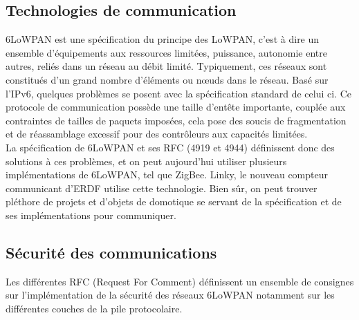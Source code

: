 	\subsection{Technologies de communication}
		6LoWPAN est une spécification du principe des LoWPAN, c'est à dire un ensemble d'équipements aux ressources limitées, puissance, autonomie entre autres, reliés dans un réseau au débit limité. Typiquement, ces réseaux sont constitués d'un grand nombre d'éléments ou nœuds dans le réseau.
		Basé sur l'IPv6, quelques problèmes se posent avec la spécification standard de celui ci. Ce protocole de communication possède une taille d'entête importante, couplée aux contraintes de tailles de paquets imposées, cela pose des soucis de fragmentation et de réassamblage excessif pour des contrôleurs aux capacités limitées.\\
		La spécification de 6LoWPAN et ses RFC (4919 et 4944) définissent donc des solutions à ces problèmes, et on peut aujourd'hui utiliser plusieurs implémentations de 6LoWPAN, tel que ZigBee. Linky, le nouveau compteur communicant d'ERDF utilise cette technologie. Bien sûr, on peut trouver pléthore de projets et d'objets de domotique se servant de la spécification et de ses implémentations pour communiquer.
		
		
	\subsection{Sécurité des communications}
		Les différentes RFC (Request For Comment) définissent un ensemble de consignes sur l'implémentation de la sécurité des réseaux 6LoWPAN notamment sur les différentes couches de la pile protocolaire.
		
